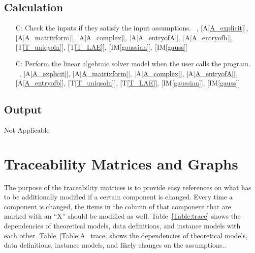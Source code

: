 \documentclass[12pt]{article}
\newcommand{\tref}[1]{T\ref{#1}}
\newcommand{\aref}[1]{A\ref{#1}}
\newcommand{\gsref}[1]{GS\ref{#1}}
\newcommand{\iref}[1]{IM\ref{#1}}
\newcounter{lcnum} %
\newcounter{calcnum} %
\begin{document}
\subsection{Calculation} \label{sec_Calculation}    

\begin{itemize}
\item[C\refstepcounter{calcnum}\thecalcnum \label{C_inputs}:]
Check the inputs if they satisfy the input assumptions.
~\newline
[\gsref{G_solveforx}], [\aref{A_explicit}], [\aref{A_matrixform}],
[\aref{A_complex}], [\aref{A_entryofA}], [\aref{A_entryofb}],
[\tref{T_uniqsoln}], [\tref{T_LAE}], [\iref{gaussian}], [\iref{gauss}]

\item[C\refstepcounter{calcnum}\thecalcnum \label{C_progname}:]
Perform the linear algebraic solver model when the user calls the program.
~\newline
[\gsref{G_solveforx}], [\aref{A_explicit}], [\aref{A_matrixform}],
[\aref{A_complex}], [\aref{A_entryofA}], [\aref{A_entryofb}],
[\tref{T_uniqsoln}], [\tref{T_LAE}], [\iref{gaussian}], [\iref{gauss}]

\end{itemize}

\subsection{Output} \label{sec_Output}

Not Applicable



\section{Traceability Matrices and Graphs}

The purpose of the traceability matrices is to provide easy references on what
has to be additionally modified if a certain component is changed. Every time a
component is changed, the items in the column of that component that are marked
with an ``X'' should be modified as well. Table~\ref{Table:trace} shows the
dependencies of theoretical models, data definitions, and instance models with
each other. Table~\ref{Table:A_trace} shows the dependencies of theoretical
models, data definitions, instance models, and likely changes on the
assumptions..
\end{document}
